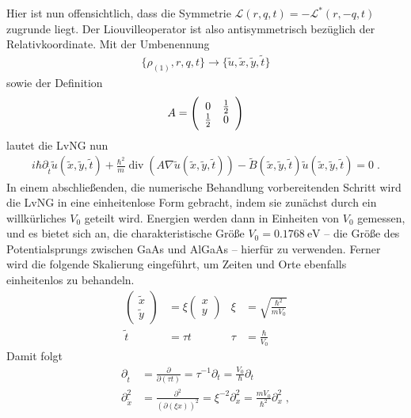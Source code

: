 Hier ist nun offensichtlich, dass die Symmetrie $\mathcal{L}(r,q,t)=-\mathcal{L}^*(r,-q,t)$ zugrunde liegt. Der Liouvilleoperator ist also antisymmetrisch bezüglich der Relativkoordinate. Mit der Umbenennung
\begin{align*}
  \{ \rho_{(1)}, r, q, t\} \longrightarrow \{\tilde{u},\tilde{x}, \tilde{y}, \tilde{t}\}
\end{align*}
sowie der Definition
\begin{align*}
  A = \left(\begin{array}{c c} 0 & \frac{1}{2} \\ \frac{1}{2} & 0 \end{array} \right)
\end{align*}
lautet die LvNG nun
\begin{align*}
  i\hbar\partial_{\tilde{t}} \tilde{u}(\tilde{x},\tilde{y},\tilde{t})+\frac{\hbar^2}{m}\operatorname{div}(A\nabla \tilde{u}(\tilde{x},\tilde{y},\tilde{t})) -  \tilde{B}(\tilde{x},\tilde{y},\tilde{t}) \tilde{u}(\tilde{x},\tilde{y},\tilde{t}) = 0 \; .
\end{align*}
In einem abschließenden, die numerische Behandlung vorbereitenden Schritt wird die LvNG in eine einheitenlose Form gebracht, indem sie zunächst durch ein willkürliches $V_0$ geteilt wird. Energien werden dann in Einheiten von $V_0$ gemessen, und es bietet sich an, die charakteristische Größe $V_0 = \SI{0.1768}{\electronvolt}$ -- die Größe des Potentialsprungs zwischen GaAs und AlGaAs  -- hierfür zu verwenden.
Ferner wird die folgende Skalierung eingeführt, um Zeiten und Orte ebenfalls einheitenlos zu behandeln.
\begin{align*}
  \left(\begin{array}{c}\tilde{x}\\\tilde{y}\end{array}\right) &= \xi \left(\begin{array}{c}x\\y\end{array}\right)   & \xi &= \sqrt{\frac{\hbar^2}{mV_0}} \\
  \tilde{t} &= \tau t   & \tau &= \frac{\hbar}{V_0}
\end{align*}
Damit folgt
\begin{align*}
  \partial_{\tilde{t}} &= \frac{\partial}{\partial (\tau t)} = \tau^{-1} \partial_t = \frac{V_0}{\hbar} \partial_t \\
  \partial_{\tilde{x}}^2 &= \frac{\partial^2}{(\partial (\xi x))^2} = \xi^{-2} \partial_x^2 = \frac{mV_0}{\hbar^2} \partial_x^2 \; ,
\end{align*}
